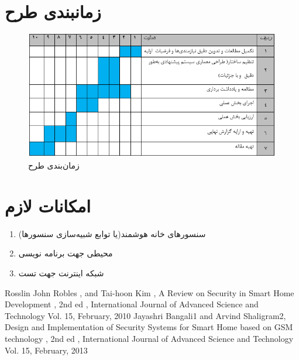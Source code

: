 \documentclass[aimcpersian]{aimc46}
\begin{document}
\section{زمانبندی طرح}
\begin{figure}[h]
\centering
\includegraphics[width=13cm]{figures/Gant.png}
\caption{زمان‌بندی طرح}
\label{Gant}
\end{figure}
\section{امکانات لازم}

 \begin{enumerate}
 \item 	سنسورهای خانه هوشمند(یا توابع شبیه‌سازی سنسورها)
\item 	محیطی جهت برنامه نویسی
\item 	شبکه اینترنت جهت تست
\end{enumerate}
\newpage
\begin{thebibliography}{25}
\begin{LTRbibitems}
\resetlatinfont
{}
Rosslin John Robles , and Tai-hoon Kim , A Review on Security in Smart Home Development , 2nd ed , International Journal of Advanced Science and Technology
 Vol. 15, February, 2010
Jayashri Bangali1 and Arvind Shaligram2,  Design and Implementation of Security Systems for Smart Home based on GSM technology  , 2nd ed , International Journal of Advanced Science and Technology Vol. 15, February, 2013       

\end{LTRbibitems}
\end{thebibliography}
\end{document}
